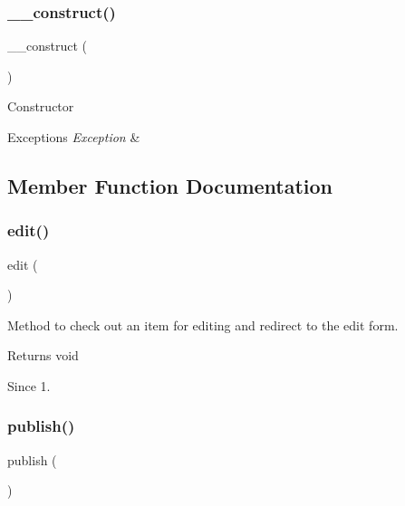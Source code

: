 \subsubsection{\+\_\+\+\_\+construct()}
{\footnotesize\ttfamily \+\_\+\+\_\+construct (\begin{DoxyParamCaption}{ }\end{DoxyParamCaption})}

Constructor


\begin{DoxyExceptions}{Exceptions}
{\em Exception} & \\
\hline
\end{DoxyExceptions}


\subsection{Member Function Documentation}
\mbox{\label{classtks__agenda_controller_download_a5cb75cbb16467eb1768837d126dc535b}} 
\subsubsection{edit()}
{\footnotesize\ttfamily edit (\begin{DoxyParamCaption}{ }\end{DoxyParamCaption})}

Method to check out an item for editing and redirect to the edit form.

\begin{DoxyReturn}{Returns}
void
\end{DoxyReturn}
\begin{DoxySince}{Since}
1. 
\end{DoxySince}
\mbox{\label{classtks__agenda_controller_download_ad3ff33669cf7b4055383b87d2ed32aa2}} 
\subsubsection{publish()}
{\footnotesize\ttfamily publish (\begin{DoxyParamCaption}{ }\end{DoxyParamCaption})}

